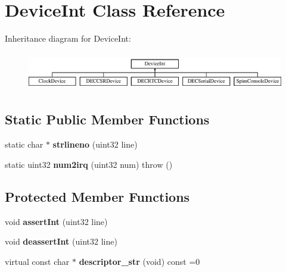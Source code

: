 \hypertarget{classDeviceInt}{
\section{DeviceInt Class Reference}
\label{classDeviceInt}
}
Inheritance diagram for DeviceInt:\begin{figure}[H]
\begin{center}
\leavevmode
\includegraphics[height=1.68421cm]{classDeviceInt}
\end{center}
\end{figure}
\subsection*{Static Public Member Functions}
\begin{DoxyCompactItemize}
\item 
\hypertarget{classDeviceInt_a7b51658efadb002993df8b4475ce29eb}{
static char $\ast$ {\bfseries strlineno} (uint32 line)}
\label{classDeviceInt_a7b51658efadb002993df8b4475ce29eb}

\item 
\hypertarget{classDeviceInt_a5a1c12ade91f0bf325a26988555f9989}{
static uint32 {\bfseries num2irq} (uint32 num)  throw ()}
\label{classDeviceInt_a5a1c12ade91f0bf325a26988555f9989}

\end{DoxyCompactItemize}
\subsection*{Protected Member Functions}
\begin{DoxyCompactItemize}
\item 
\hypertarget{classDeviceInt_a2b7e17c5314630680c3a09a9e706f870}{
void {\bfseries assertInt} (uint32 line)}
\label{classDeviceInt_a2b7e17c5314630680c3a09a9e706f870}

\item 
\hypertarget{classDeviceInt_ad7387f17b6dfa6acf90e857a7e33aa01}{
void {\bfseries deassertInt} (uint32 line)}
\label{classDeviceInt_ad7387f17b6dfa6acf90e857a7e33aa01}

\item 
\hypertarget{classDeviceInt_a8e93853ae77b6a63a140ed498d9fc8b8}{
virtual const char $\ast$ {\bfseries descriptor\_\-str} (void) const =0}
\label{classDeviceInt_a8e93853ae77b6a63a140ed498d9fc8b8}

\end{DoxyCompactItemize}
